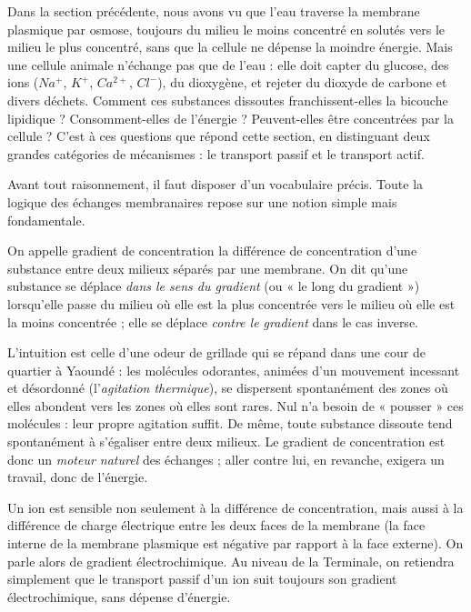 \documentclass[11pt]{article}
\newcommand{\cle}[1]{{\popxbold\color{popdark}#1}}
\newcounter{popsec}
\newcounter{popsub}
\newcommand{\courssub}[1]{%
  \stepcounter{popsub}%
  \par\vspace{9pt}\noindent{\popxbold\fontsize{11.5}{13}\selectfont\color{popink}{\color{poporange}\thepopsec.\thepopsub}\hspace{6pt}#1}\par\nopagebreak\vspace{4pt}
}
\begin{document}
Dans la section précédente, nous avons vu que l'eau traverse la membrane plasmique par osmose, toujours du milieu le moins concentré en solutés vers le milieu le plus concentré, sans que la cellule ne dépense la moindre énergie. Mais une cellule animale n'échange pas que de l'eau : elle doit capter du \cle{glucose}, des \cle{ions} ($Na^+$, $K^+$, $Ca^{2+}$, $Cl^-$), du \cle{dioxygène}, et rejeter du \cle{dioxyde de carbone} et divers déchets. Comment ces substances dissoutes franchissent-elles la bicouche lipidique ? Consomment-elles de l'énergie ? Peuvent-elles être concentrées par la cellule ? C'est à ces questions que répond cette section, en distinguant deux grandes catégories de mécanismes : le \cle{transport passif} et le \cle{transport actif}.

\courssub{Notion préalable : le gradient de concentration}

Avant tout raisonnement, il faut disposer d'un vocabulaire précis. Toute la logique des échanges membranaires repose sur une notion simple mais fondamentale.

\begin{definition}
On appelle \cle{gradient de concentration} la différence de concentration d'une substance entre deux milieux séparés par une membrane. On dit qu'une substance se déplace \emph{dans le sens du gradient} (ou « le long du gradient ») lorsqu'elle passe du milieu où elle est la plus concentrée vers le milieu où elle est la moins concentrée ; elle se déplace \emph{contre le gradient} dans le cas inverse.
\end{definition}

L'intuition est celle d'une odeur de grillade qui se répand dans une cour de quartier à Yaoundé : les molécules odorantes, animées d'un mouvement incessant et désordonné (l'\emph{agitation thermique}), se dispersent spontanément des zones où elles abondent vers les zones où elles sont rares. Nul n'a besoin de « pousser » ces molécules : leur propre agitation suffit. De même, toute substance dissoute tend spontanément à s'égaliser entre deux milieux. Le gradient de concentration est donc un \emph{moteur naturel} des échanges ; aller contre lui, en revanche, exigera un travail, donc de l'énergie.

\begin{attention}
Un ion est sensible non seulement à la différence de concentration, mais aussi à la différence de charge électrique entre les deux faces de la membrane (la face interne de la membrane plasmique est négative par rapport à la face externe). On parle alors de \cle{gradient électrochimique}. Au niveau de la Terminale, on retiendra simplement que le transport passif d'un ion suit toujours son gradient électrochimique, sans dépense d'énergie.
\end{attention}
\end{document}
